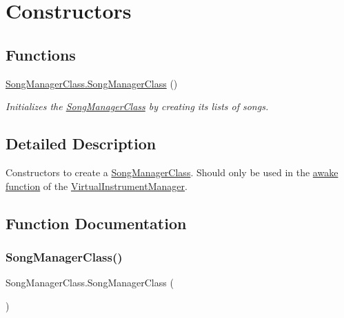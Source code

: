 \hypertarget{group___s_m_construct}{}\section{Constructors}
\label{group___s_m_construct}
\subsection*{Functions}
\begin{DoxyCompactItemize}
\item 
\hyperlink{group___s_m_construct_gacd94623c6402ad7c7af2f725265d0e4d}{Song\+Manager\+Class.\+Song\+Manager\+Class} ()
\begin{DoxyCompactList}\small\item\em Initializes the \hyperlink{class_song_manager_class}{Song\+Manager\+Class} by creating its lists of songs. \end{DoxyCompactList}\end{DoxyCompactItemize}


\subsection{Detailed Description}
Constructors to create a \hyperlink{class_song_manager_class}{Song\+Manager\+Class}. Should only be used in the \hyperlink{group___v_i_m_unity_gab92bac4e22476ffe39fc40f49fbd6ae5}{awake function} of the \hyperlink{group___v_i_m}{Virtual\+Instrument\+Manager}. 

\subsection{Function Documentation}
\mbox{\label{group___s_m_construct_gacd94623c6402ad7c7af2f725265d0e4d}} 
\subsubsection{\texorpdfstring{Song\+Manager\+Class()}{SongManagerClass()}}
{\footnotesize\ttfamily Song\+Manager\+Class.\+Song\+Manager\+Class (\begin{DoxyParamCaption}{ }\end{DoxyParamCaption})}




